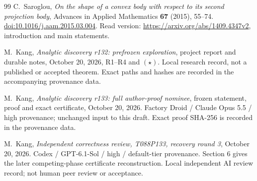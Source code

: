\begin{thebibliography}{99}
C.~Saroglou, \emph{On the shape of a convex body with respect to its
second projection body}, Advances in Applied Mathematics
\textbf{67} (2015), 55--74.
\href{https://doi.org/10.1016/j.aam.2015.03.004}{doi:10.1016/j.aam.2015.03.004}.
Read version: \url{https://arxiv.org/abs/1409.4347v2}, introduction and main statements.

M.~Kang, \emph{Analytic discovery r132: prefrozen exploration},
project report and durable notes, October 20, 2026, R1--R4 and $(\star)$.
Local research record, not a published or accepted theorem.
Exact paths and hashes are recorded in the accompanying provenance data.

M.~Kang, \emph{Analytic discovery r133: full author-proof nominee},
frozen statement, proof and exact certificate, October 20, 2026.
Factory Droid / Claude Opus 5.5 / high provenance; unchanged input to this draft.
Exact proof SHA-256 is recorded in the provenance data.

M.~Kang, \emph{Independent correctness review, T088P133, recovery round 3},
October 20, 2026. Codex / GPT-6.1-Sol / high / default-tier provenance.
Section 6 gives the later competing-phase certificate reconstruction.
Local independent AI review record; not human peer review or acceptance.
\end{thebibliography}
\endgroup
